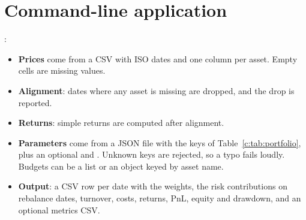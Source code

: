 
\chapter{Command-line application}\label{c:sec:cli}
:
\begin{itemize}
  \item \textbf{Prices} come from a CSV with ISO dates and one column per asset. Empty
        cells are missing values.
  \item \textbf{Alignment}: dates where any asset is missing are dropped, and the drop is
        reported.
  \item \textbf{Returns}: simple returns are computed after alignment.
  \item \textbf{Parameters} come from a JSON file with the keys of
        Table~\ref{c:tab:portfolio}, plus an optional  and . Unknown
        keys are rejected, so a typo fails loudly. Budgets can be a list or an object keyed
        by asset name.
  \item \textbf{Output}: a CSV row per date with the weights, the risk contributions on
        rebalance dates, turnover, costs, returns, PnL, equity and drawdown, and an optional
        metrics CSV.
\end{itemize}
\begin{codepointers}
\end{codepointers}


